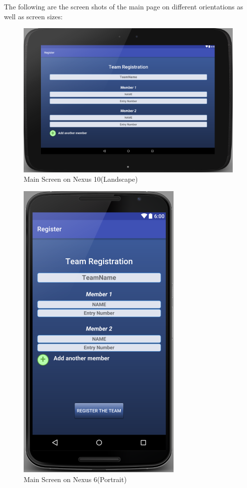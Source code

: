 \documentclass{article}
\begin{document}
\par\noindent The following are the screen shots of the main page on different orientations as well as screen sizes:

\begin{figure}
	\centering
  \includegraphics[scale=0.8]{N10-land.PNG}
  \caption{ Main Screen on Nexus 10(Landscape)}
  \label{n10main}
\end{figure}

\begin{figure}
    \centering
    \includegraphics[scale=0.75]{N6.PNG}
    \caption{Main Screen on Nexus 6(Portrait)}
    \label{n9p}
\end{figure}
\end{document}
